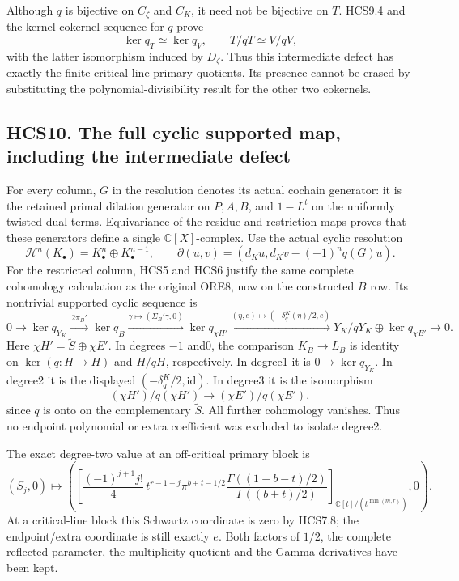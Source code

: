 Although \(q\) is bijective on \(C_\zeta\) and \(C_K\), it need not be
bijective on \(T\). HCS9.4 and the kernel-cokernel sequence for \(q\)
prove \[
\ker q_T\simeq\ker q_V,\qquad T/qT\simeq V/qV,
\tag{HCS9.7}
\] with the latter isomorphism induced by \(D_\zeta\). Thus this
intermediate defect has exactly the finite critical-line primary
quotients. Its presence cannot be erased by substituting the
polynomial-divisibility result for the other two cokernels.

\subsection{HCS10. The full cyclic supported map, including the
intermediate
defect}\label{hcs10.-the-full-cyclic-supported-map-including-the-intermediate-defect}

For every column, \(G\) in the resolution denotes its actual cochain
generator: it is the retained primal dilation generator on \(P,A,B\),
and \(1-L^t\) on the uniformly twisted dual terms. Equivariance of the
residue and restriction maps proves that these generators define a
single \(\mathbb C[X]\)-complex. Use the actual cyclic resolution \[
\mathscr H^n(K_\bullet)=K_\bullet^n\oplus K_\bullet^{n-1},
\qquad
\partial(u,v)=(d_Ku,d_Kv-(-1)^nq(G)u).
\tag{HCS10.1}
\] For the restricted column, HCS5 and HCS6 justify the same complete
cohomology calculation as the original ORE8, now on the constructed
\(B\) row. Its nontrivial supported cyclic sequence is \[
\boxed{
0\to\ker q_{Y_K}\xrightarrow{\,2\pi_B'\,}
\ker q_{\widetilde B}\xrightarrow{\gamma\mapsto(\Sigma_B'\gamma,0)}
\ker q_{\chi H'}
\xrightarrow{(\eta,e)\mapsto(-\delta_q^K(\eta)/2,e)}
Y_K/qY_K\oplus\ker q_{\chi E'}\to0.}
\tag{HCS10.2}
\] Here \(\chi H'=\widetilde S\oplus\chi E'\). In degrees \(-1\) and0,
the comparison \(K_B\to L_B\) is identity on \(\ker(q:H\to H)\) and
\(H/qH\), respectively. In degree1 it is \(0\to\ker q_{Y_K}\). In
degree2 it is the displayed \((-\delta_q^K/2,\mathrm{id})\). In degree3
it is the isomorphism \[
(\chi H')/q(\chi H')\to(\chi E')/q(\chi E'),
\tag{HCS10.3}
\] since \(q\) is onto on the complementary \(\widetilde S\). All
further cohomology vanishes. Thus no endpoint polynomial or extra
coefficient was excluded to isolate degree2.

The exact degree-two value at an off-critical primary block is \[
\boxed{
(S_j,0)\longmapsto
\left(
\left[\frac{(-1)^{j+1}j!}{4}\,
t^{r-1-j}\pi^{b+t-1/2}
\frac{\Gamma((1-b-t)/2)}{\Gamma((b+t)/2)}
\right]_{\mathbb C[t]/(t^{\min(m,r)})},
0\right).}
\tag{HCS10.4}
\] At a critical-line block this Schwartz coordinate is zero by HCS7.8;
the endpoint/extra coordinate is still exactly \(e\). Both factors of
\(1/2\), the complete reflected parameter, the multiplicity quotient and
the Gamma derivatives have been kept.

